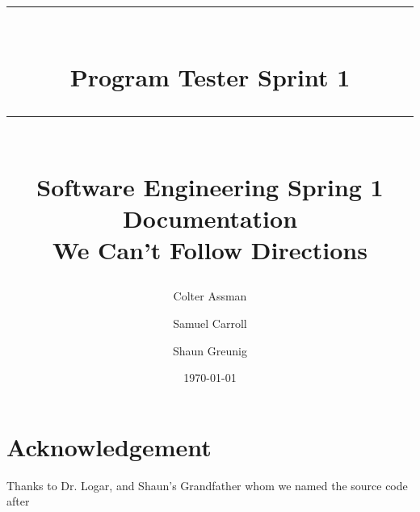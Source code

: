 \documentclass{book}
\title{{\color{MSBlue1} \rule{\linewidth}{0.5mm}}\\[2mm] {\huge \bfseries \color{MSBlue1} Program Tester Sprint 1 }\\[-1mm] {\color{MSBlue1}\rule{\linewidth}{0.5mm}} \\  \vfill
{\LARGE \bfseries \color{MSBlue2} Software Engineering Spring 1 Documentation }\\  \vfill 
{\color{MSBlue1} We Can't Follow Directions} }
\author{\color{MSBlue1}  Colter Assman \and \color{MSBlue1} Samuel Carroll \and  \color{MSBlue1} Shaun Greunig }
\date{\color{MSBlue1} \today}
\begin{document}
\frontmatter
\maketitle


\tableofcontents
\listoffigures
\listoftables
\listofalgorithms




 
\mainmatter













\backmatter
\chapter{Acknowledgement}
\label{SpecialThanks}  Thanks to Dr. Logar, and Shaun's Grandfather whom we named the
source code after  


\setcounter{section}{0}


\end{document}
